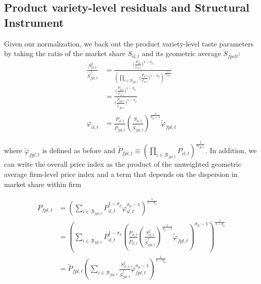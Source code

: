 \subsection{Product variety-level residuals and Structural Instrument}\label{app:theory_residuals_instrument}
Given our normalization, we back out the product variety-level taste parameters by taking the ratio of the market share $S_{il,t}$ and its geometric average $\tilde{S}_{fpclt}$: 
\begin{equation*}
    \begin{aligned}
        \frac{S^f_{il,t}}{\tilde{S}^f_{fpl,t}} 
            &=  \frac{\bigg(\frac{P_{ilt}}{\varphi_{il,t}}\bigg)^{1-\sigma_p}}
                     {  \left(
                            \prod_{i \in \mathcal{B}_{fpl,t}} \bigg(\frac{P_{il,t}}{\varphi_{il,t}}\bigg)^{1-\sigma_p}
                        \right)^{\frac{1}{N_{fpl,t}}}} \\
            &=  \frac{\bigg(\frac{P_{il,t}}{\varphi_{il,t}}\bigg)^{1-\sigma_p}}
                     {\bigg(\frac{\tilde{P}_{fpl,t}}{\tilde{\varphi}_{fpl,t}}\bigg)^{1-\sigma_p}} \\
        \varphi_{il,t} 
            &=  \frac{P_{il,t}}{\tilde{P}_{fpl,t}}  
                \left(\frac{S_{il,t}}{\tilde{S}_{fpl,t}}\right)^{\frac{1}{\sigma_p-1}} 
                \tilde{\varphi}_{fpl,t}
    \end{aligned}
\end{equation*}

\noindent where $\tilde{\varphi}_{fpl,t}$ is defined as before and $\tilde{P}_{fpl,t} \equiv \left(\prod_{i \in \mathcal{B}_{fpl,t}} P_{il,t}\right)^{\frac{1}{N_{fpl,t}}}$. In addition, we can write the overall price index as the product of the unweighted geometric average firm-level price index and a term that depends on the dispersion in market share within firm 

\begin{equation*}
    \begin{aligned}
       P_{fpl,t}   &=   \left(
                            \sum_{i \in \mathcal{B}_{fpl,t}} P_{il,t}^{1-\sigma_p} \varphi_{il,t}^{\sigma_p-1} 
                        \right)^{\frac{1}{1-\sigma_p}} \\
                    &=  \left(\sum_{i \in \mathcal{B}_{fpl,t}} P_{il,t}^{1-\sigma_p}
                                \left(\frac{P_{il,t}}{\tilde{P}_{il,t}}  
                                    \left(\frac{S^f_{il,t}}{\tilde{S}^f_{fpl,t}}\right)^{\frac{1}{\sigma_p-1}} \tilde{\varphi}_{fpl,t}
                                \right)^{\sigma_p-1} 
                        \right)^{\frac{1}{1-\sigma_p}} \\
                    &=  \tilde{P}_{fpl,t} 
                        \left(
                            \sum_{i \in \mathcal{B}_{fpl,t}} \frac{S^f_{il,t}}{\tilde{S}^f_{fpl,t}} 
                            \tilde{\varphi}_{fpl,t}^{\sigma_p-1}
                        \right)^{\frac{1}{1-\sigma_p}}
    \end{aligned}
\end{equation*}

